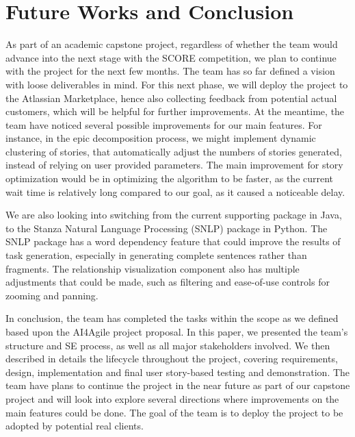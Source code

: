 \section{Future Works and Conclusion}
\label{conclusion}
As part of an academic capstone project, regardless of whether the team would advance into the next stage with the SCORE competition, we plan to continue with the project for the next few months. The team has so far defined a vision with loose deliverables in mind. For this next phase, we will deploy the project to the Atlassian Marketplace, hence also collecting feedback from potential actual customers, which will be helpful for further improvements.  At the meantime, the team have noticed several possible improvements for our main features. For instance, in the epic decomposition process, we might implement dynamic clustering of stories, that automatically adjust the numbers of stories generated, instead of relying on user provided parameters. The main improvement for story optimization would be in optimizing the algorithm to be faster, as the current wait time is relatively long compared to our goal, as it caused a noticeable delay. 

We are also looking into switching from the current supporting package in Java, to the Stanza Natural Language Processing (SNLP) \cite{NLP1} package in Python. The SNLP package has a word dependency feature that could improve the results of task generation, especially in generating complete sentences rather than fragments. The relationship visualization component also has multiple adjustments that could be made, such as filtering and ease-of-use controls for zooming and panning. 

In conclusion, the team has completed the tasks within the scope as we defined based upon the AI4Agile project proposal. In this paper, we presented the team's structure and SE process, as well as all major stakeholders involved. We then described in details the lifecycle throughout the project, covering requirements, design, implementation and final user story-based testing and demonstration. The team have plans to continue the project in the near future as part of our capstone project and will look into explore several directions where improvements on the main features could be done. The goal of the team is to deploy the project to be adopted by potential real clients. 